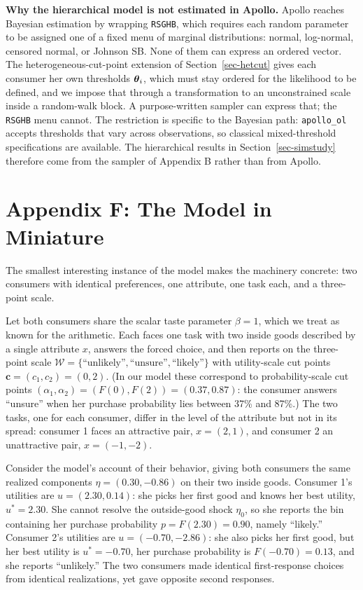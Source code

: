 \documentclass[
  letterpaper,
  DIV=11,
  numbers=noendperiod]{scrartcl}
\theoremstyle{plain}
\theoremstyle{plain}
\theoremstyle{plain}
\theoremstyle{remark}
\begin{document}
\textbf{Why the hierarchical model is not estimated in Apollo.} Apollo
reaches Bayesian estimation by wrapping \texttt{RSGHB}, which requires
each random parameter to be assigned one of a fixed menu of marginal
distributions: normal, log-normal, censored normal, or Johnson SB. None
of them can express an ordered vector. The heterogeneous-cut-point
extension of Section~\ref{sec-hetcut} gives each consumer her own
thresholds \(\boldsymbol{\theta}_i\), which must stay ordered for the likelihood to
be defined, and we impose that through a transformation to an
unconstrained scale inside a random-walk block. A purpose-written
sampler can express that; the \texttt{RSGHB} menu cannot. The
restriction is specific to the Bayesian path: \texttt{apollo\_ol}
accepts thresholds that vary across observations, so classical
mixed-threshold specifications are available. The hierarchical results
in Section~\ref{sec-simstudy} therefore come from the sampler of
Appendix B rather than from Apollo.

\section*{Appendix F: The Model in Miniature}\label{sec-toy}

The smallest interesting instance of the model makes the machinery
concrete: two consumers with identical preferences, one attribute, one
task each, and a three-point scale.

Let both consumers share the scalar taste parameter \(\beta = 1\), which
we treat as known for the arithmetic. Each faces one task with two
inside goods described by a single attribute \(x\), answers the forced
choice, and then reports on the three-point scale
\(\mathcal{W} = \lbrace \text{“unlikely”}, \text{“unsure”}, \text{“likely”} \rbrace\)
with utility-scale cut points \(\mathbf{c} = (c_1, c_2) = (0, 2)\). (In
our model these correspond to probability-scale cut points
\(\left( \alpha_1, \alpha_2 \right) = \left( F(0), F(2) \right) = (0.37, 0.87)\):
the consumer answers ``unsure'' when her purchase probability lies
between 37\% and 87\%.) The two tasks, one for each consumer, differ in
the level of the attribute but not in its spread: consumer 1 faces an
attractive pair, \(x = (2, 1)\), and consumer 2 an unattractive pair,
\(x = (-1, -2)\).

Consider the model's account of their behavior, giving both consumers
the same realized components \(\eta = (0.30, -0.86)\) on their two
inside goods. Consumer 1's utilities are \(u = (2.30, 0.14)\): she picks
her first good and knows her best utility, \(u^* = 2.30\). She cannot
resolve the outside-good shock \(\eta_0\), so she reports the bin
containing her purchase probability \(p = F(2.30) = 0.90\), namely
``likely.'' Consumer 2's utilities are \(u = (-0.70, -2.86)\): she also
picks her first good, but her best utility is \(u^* = -0.70\), her
purchase probability is \(F(-0.70) = 0.13\), and she reports
``unlikely.'' The two consumers made identical first-response choices
from identical realizations, yet gave opposite second responses.
\end{document}

